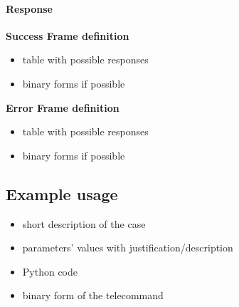 \paragraph{Response}
    \textbf{Success Frame definition}
    \begin{itemize}
        \item table with possible responses
        \item binary forms if possible
    \end{itemize}


    \textbf{Error Frame definition}
    \begin{itemize}
        \item table with possible responses
        \item binary forms if possible
    \end{itemize}

\subsection{Example usage}

\begin{itemize}
    \item short description of the case
    \item parameters' values with justification/description
    \item Python code
    \item binary form of the telecommand
\end{itemize}
